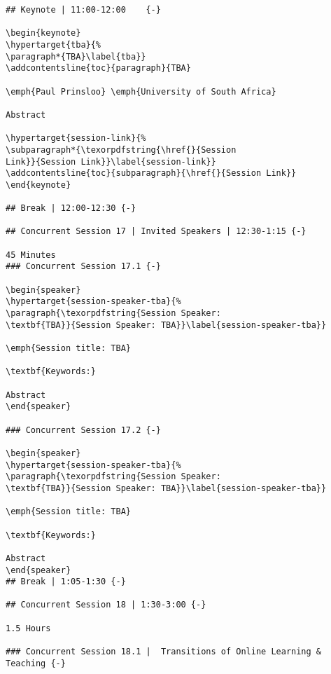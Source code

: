 \documentclass[
]{book}
\begin{document}
\begin{verbatim}
## Keynote | 11:00-12:00    {-}

\begin{keynote}
\hypertarget{tba}{%
\paragraph*{TBA}\label{tba}}
\addcontentsline{toc}{paragraph}{TBA}

\emph{Paul Prinsloo} \emph{University of South Africa}

Abstract

\hypertarget{session-link}{%
\subparagraph*{\texorpdfstring{\href{}{Session
Link}}{Session Link}}\label{session-link}}
\addcontentsline{toc}{subparagraph}{\href{}{Session Link}}
\end{keynote}

## Break | 12:00-12:30 {-}

## Concurrent Session 17 | Invited Speakers | 12:30-1:15 {-}

45 Minutes
### Concurrent Session 17.1 {-}

\begin{speaker}
\hypertarget{session-speaker-tba}{%
\paragraph{\texorpdfstring{Session Speaker:
\textbf{TBA}}{Session Speaker: TBA}}\label{session-speaker-tba}}

\emph{Session title: TBA}

\textbf{Keywords:}

Abstract
\end{speaker}

### Concurrent Session 17.2 {-}

\begin{speaker}
\hypertarget{session-speaker-tba}{%
\paragraph{\texorpdfstring{Session Speaker:
\textbf{TBA}}{Session Speaker: TBA}}\label{session-speaker-tba}}

\emph{Session title: TBA}

\textbf{Keywords:}

Abstract
\end{speaker}
## Break | 1:05-1:30 {-}

## Concurrent Session 18 | 1:30-3:00 {-}

1.5 Hours

### Concurrent Session 18.1 |  Transitions of Online Learning & Teaching {-}


\end{verbatim}
\end{document}
